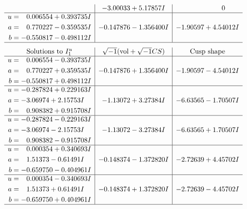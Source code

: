 \documentclass[1p]{elsarticle_modified}
\theoremstyle{definition}
\newcommand{\I}{\sqrt{-1}}
\begin{document}
$$\begin{array}{c|c|c}
 & -3.00033 + 5.17857 I & \phantom{-0.000000 } 0 \\ \hline\begin{aligned}
u &= \phantom{-}0.006554 + 0.393735 I \\
a &= \phantom{-}0.770227 - 0.359535 I \\
b &= -0.550817 - 0.498112 I\end{aligned}
 & -0.147876 - 1.356400 I & -1.90597 + 4.54012 I\\
 \hline 
 \end{array}$$\newpage$$\begin{array}{c|c|c}  
\text{Solutions to }I^u_{1}& \I (\text{vol} + \sqrt{-1}CS) & \text{Cusp shape}\\
 \hline 
\begin{aligned}
u &= \phantom{-}0.006554 - 0.393735 I \\
a &= \phantom{-}0.770227 + 0.359535 I \\
b &= -0.550817 + 0.498112 I\end{aligned}
 & -0.147876 + 1.356400 I & -1.90597 - 4.54012 I \\ \hline\begin{aligned}
u &= -0.287824 + 0.229163 I \\
a &= -3.06974 + 2.15753 I \\
b &= \phantom{-}0.908382 + 0.915708 I\end{aligned}
 & -1.13072 + 3.27384 I & -6.63565 - 1.70507 I \\ \hline\begin{aligned}
u &= -0.287824 - 0.229163 I \\
a &= -3.06974 - 2.15753 I \\
b &= \phantom{-}0.908382 - 0.915708 I\end{aligned}
 & -1.13072 - 3.27384 I & -6.63565 + 1.70507 I \\ \hline\begin{aligned}
u &= \phantom{-}0.000354 + 0.340693 I \\
a &= \phantom{-}1.51373 - 0.61491 I \\
b &= -0.659750 - 0.404961 I\end{aligned}
 & -0.148374 - 1.372820 I & -2.72639 + 4.45702 I \\ \hline\begin{aligned}
u &= \phantom{-}0.000354 - 0.340693 I \\
a &= \phantom{-}1.51373 + 0.61491 I \\
b &= -0.659750 + 0.404961 I\end{aligned}
 & -0.148374 + 1.372820 I & -2.72639 - 4.45702 I\\
 \hline 
 \end{array}$$\newpage
\end{document}
